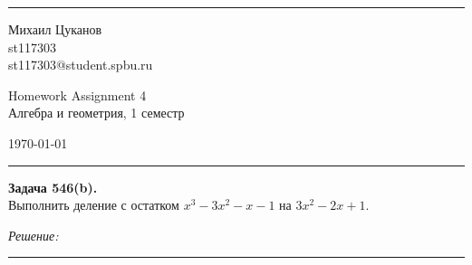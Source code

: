\documentclass[a4paper, 12pt]{article}
\newenvironment{problem}[2][Задача]
    { \begin{mdframed}[backgroundcolor=gray!10] \textbf{#1 #2.} \\}
    {  \end{mdframed}}
\newenvironment{solution}
    {\textit{Решение: }}
    {\noindent\rule{7in}{1.5pt}}
\begin{document}

\fancyhead[C]{}
\hrule \medskip %
\begin{minipage}{0.295\textwidth} 
\raggedright\footnotesize
Михаил Цуканов \hfill\\   
st117303 \hfill\\
st117303@student.spbu.ru
\end{minipage}
\begin{minipage}{0.4\textwidth} 
\centering\large 
Homework Assignment 4\\ 
\normalsize 
Алгебра и геометрия, 1 семестр\\ 
\end{minipage}
\begin{minipage}{0.295\textwidth} 
\raggedleft
\today\hfill\\
\end{minipage}
\medskip\hrule 
\bigskip


%
%
%


\begin{problem}{546(b)}
Выполнить деление с остатком $x^3-3x^2-x-1$ на $3x^2-2x+1$.
\end{problem}
\begin{solution}


\end{solution} 
\end{document}
